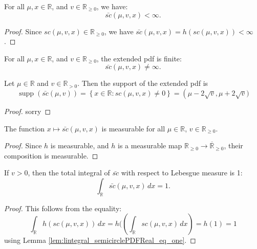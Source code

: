 \begin{lemma}
  \leanok
  \label{lem:semicirclePDF_finite}
  For all $\mu, x \in \mathbb{R}$, and $v \in \mathbb{R}_{\ge 0}$, we have:
    $$
    \bar{sc}(\mu,v,x) < \infty.
    $$
\end{lemma}
\begin{proof}
Since $sc(\mu,v,x) \in \mathbb{R}_{\ge 0}$, we have $\bar{sc}(\mu,v,x) = h(sc(\mu,v,x)) < \infty$.
\end{proof}

\begin{lemma}
  \leanok
  \label{lem:semicirclePDF_ne_top}
  For all \( \mu, x \in \mathbb{R} \), and \( v \in \mathbb{R}_{\ge 0} \), the extended pdf is finite:
  \[
    \bar{sc}(\mu,v,x) \ne \infty.
  \]
\end{lemma}

\begin{lemma}
  \leanok
  \label{lem:support_semicirclePDF}
  Let \( \mu \in \mathbb{R} \) and \( v \in \mathbb{R}_{> 0} \). Then the support of the extended pdf is
  \[
      \operatorname{supp}(\bar{sc}(\mu,v)) = \left\{ x \in \mathbb{R} : sc(\mu,v,x) \ne 0 \right\}
    = \left(\mu - 2\sqrt{v}, \mu + 2\sqrt{v})\right.
  \]
\end{lemma}
\begin{proof}
    sorry
\end{proof}

\begin{lemma}
  \leanok
  \label{lem:measurable_semicirclePDF}
  The function \( x \mapsto \bar{sc}(\mu,v,x) \) is measurable for all \( \mu \in \mathbb{R} \), \( v \in \mathbb{R}_{\ge 0} \).
\end{lemma}
\begin{proof}
  Since $h$ is measurable, and $h$ is a measurable map \( \mathbb{R}_{\ge 0} \to \overline{\mathbb{R}}_{\ge 0} \), their composition is measurable.
\end{proof}

\begin{lemma}
  \leanok
  \label{lem:lintegral_semicirclePDF_eq_one}
  If $v > 0$, then the total integral of $\bar{sc}$ with respect to Lebesgue measure is 1:
  \[
      \int_{\mathbb{R}} \bar{sc}(\mu,v,x) \, dx = 1.
  \]
\end{lemma}
\begin{proof}
  This follows from the equality:
  \[
  \int_{\mathbb{R}} h(sc(\mu,v,x)) \, dx = h( \left( \int_{\mathbb{R}} sc(\mu,v,x) \, dx \right) = h(1) = 1
  \]
  using Lemma \ref{lem:lintegral_semicirclePDFReal_eq_one}.
\end{proof}


